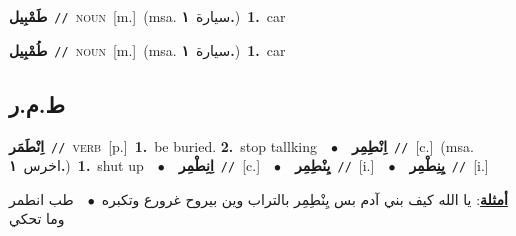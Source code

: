 \documentclass[10pt,a4paper,twoside]{article} %
\begin{document}
\begin{multicols}{2}
{\setlength\topsep{0pt}\textbf{\foreignlanguage{arabic}{طَمْبِيل}}\ {\color{gray}\texttt{//}\color{black}}\ \textsc{noun}\ [m.]\ \color{gray}(msa. \foreignlanguage{arabic}{سيارة}~\foreignlanguage{arabic}{\textbf{١.}})\color{black}\ \textbf{1.}~car\ } \vspace{2mm}

{\setlength\topsep{0pt}\textbf{\foreignlanguage{arabic}{طُمْبِيل}}\ {\color{gray}\texttt{//}\color{black}}\ \textsc{noun}\ [m.]\ \color{gray}(msa. \foreignlanguage{arabic}{سيارة}~\foreignlanguage{arabic}{\textbf{١.}})\color{black}\ \textbf{1.}~car\ } \vspace{2mm}

\vspace{-3mm}
\subsection*{\color{blue}\foreignlanguage{arabic}{ط.م.ر}\color{blue}{}} 

{\setlength\topsep{0pt}\textbf{\foreignlanguage{arabic}{اِنْطَمَر}}\ {\color{gray}\texttt{//}\color{black}}\ \textsc{verb}\ [p.]\ \textbf{1.}~be buried.  \textbf{2.}~stop tallking\ \ $\bullet$\ \ \setlength\topsep{0pt}\textbf{\foreignlanguage{arabic}{اِنْطِمِر}}\ {\color{gray}\texttt{//}\color{black}}\ [c.]\ \color{gray}(msa. \foreignlanguage{arabic}{اخرس}~\foreignlanguage{arabic}{\textbf{١.}})\color{black}\ \textbf{1.}~shut up\ \ $\bullet$\ \ \setlength\topsep{0pt}\textbf{\foreignlanguage{arabic}{اِنِطْمِر}}\ {\color{gray}\texttt{//}\color{black}}\ [c.]\ \ $\bullet$\ \ \setlength\topsep{0pt}\textbf{\foreignlanguage{arabic}{يِنْطِمِر}}\ {\color{gray}\texttt{//}\color{black}}\ [i.]\ \ $\bullet$\ \ \setlength\topsep{0pt}\textbf{\foreignlanguage{arabic}{يِنِطْمِر}}\ {\color{gray}\texttt{//}\color{black}}\ [i.]\  \begin{flushright}\color{gray}\foreignlanguage{arabic}{\textbf{\underline{\foreignlanguage{arabic}{أمثلة}}}: يا الله كيف بني آدم بس يِنْطِمِر بالتراب وين بيروح غرورع وتكبره\ $\bullet$\ \  طب انطمر وما تحكي}\end{flushright}\color{black}} \vspace{2mm}


\end{multicols}
\end{document}
